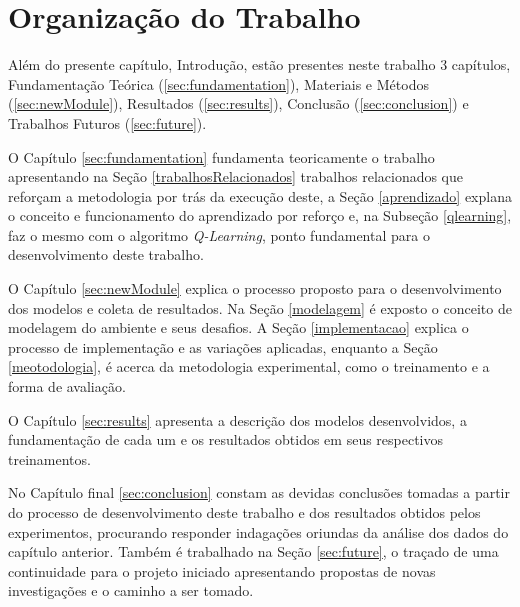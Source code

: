 \section{Organização do Trabalho}

Além do presente capítulo, Introdução, estão presentes neste trabalho 3 capítulos, Fundamentação
Teórica (\ref{sec:fundamentation}), Materiais e Métodos (\ref{sec:newModule}), Resultados
(\ref{sec:results}), Conclusão (\ref{sec:conclusion}) e Trabalhos Futuros (\ref{sec:future}).

O Capítulo \ref{sec:fundamentation} fundamenta teoricamente o trabalho apresentando na Seção
\ref{trabalhosRelacionados} trabalhos relacionados que reforçam a metodologia por trás da execução
deste, a Seção \ref{aprendizado} explana o conceito e funcionamento do aprendizado por reforço e, na
Subseção \ref{qlearning}, faz o mesmo com o algoritmo \textit{Q-Learning}, ponto fundamental para o
desenvolvimento deste trabalho.

O Capítulo \ref{sec:newModule} explica o processo proposto para o desenvolvimento dos modelos e
coleta de resultados. Na Seção \ref{modelagem} é exposto o conceito de modelagem do ambiente e seus
desafios. A Seção \ref{implementacao} explica o processo de implementação e as
variações aplicadas, enquanto a Seção \ref{meotodologia}, é acerca da metodologia
experimental, como o treinamento e a forma de avaliação.

O Capítulo \ref{sec:results} apresenta a descrição dos modelos desenvolvidos, a fundamentação de
cada um e os resultados obtidos em seus respectivos treinamentos.

No Capítulo final \ref{sec:conclusion} constam as devidas conclusões tomadas a partir do processo de
desenvolvimento deste trabalho e dos resultados obtidos pelos experimentos, procurando responder
indagações oriundas da análise dos dados do capítulo anterior. Também é
trabalhado na Seção \ref{sec:future}, o traçado de uma continuidade
para o projeto iniciado apresentando propostas de novas investigações e o caminho a ser tomado.